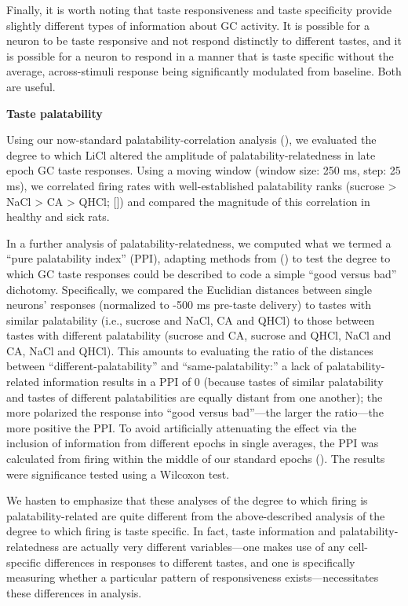 \begin{refsection}
{Finally, it is worth noting that taste responsiveness and taste specificity provide slightly different types of information about GC activity. It is possible for a neuron to be taste responsive and not respond distinctly to different tastes, and it is possible for a neuron to respond in a manner that is taste specific without the average, across-stimuli response being significantly modulated from baseline. Both are useful.

\smallskip
\noindent\textbf{Taste palatability}\par
\noindent 
Using our now-standard palatability-correlation analysis (\cite{sadacca2016a,moran2014a,li2016a,piette2012a}), we evaluated the degree to which LiCl altered the amplitude of palatability-relatedness in late epoch GC taste responses. Using a moving window (window size: 250 ms, step: 25 ms), we correlated firing rates with well-established palatability ranks (sucrose > NaCl > CA > QHCl; [\cite{sadacca2016a,li2013a}]) and compared the magnitude of this correlation in healthy and sick rats.

In a further analysis of palatability-relatedness, we computed what we termed a “pure palatability index” (PPI), adapting methods from (\cite{fontanini2009a}) to test the degree to which GC taste responses could be described to code a simple “good versus bad” dichotomy. Specifically, we compared the Euclidian distances between single neurons’ responses (normalized to -500 ms pre-taste delivery) to tastes with similar palatability (i.e., sucrose and NaCl, CA and QHCl) to those between tastes with different palatability (sucrose and CA, sucrose and QHCl, NaCl and CA, NaCl and QHCl). This amounts to evaluating the ratio of the distances between “different-palatability” and “same-palatability:” a lack of palatability-related information results in a PPI of 0 (because tastes of similar palatability and tastes of different palatabilities are equally distant from one another); the more polarized the response into “good versus bad”—the larger the ratio—the more positive the PPI. To avoid artificially attenuating the effect via the inclusion of information from different epochs in single averages, the PPI was calculated from firing within the middle of our standard epochs (\cite{katz-a,katz2001a}). The results were significance tested using a Wilcoxon test.

We hasten to emphasize that these analyses of the degree to which firing is palatability-related are quite different from the above-described analysis of the degree to which firing is taste specific. In fact, taste information and palatability-relatedness are actually very different variables—one makes use of any cell-specific differences in responses to different tastes, and one is specifically measuring whether a particular pattern of responsiveness exists—necessitates these differences in analysis.

}
\end{refsection}
